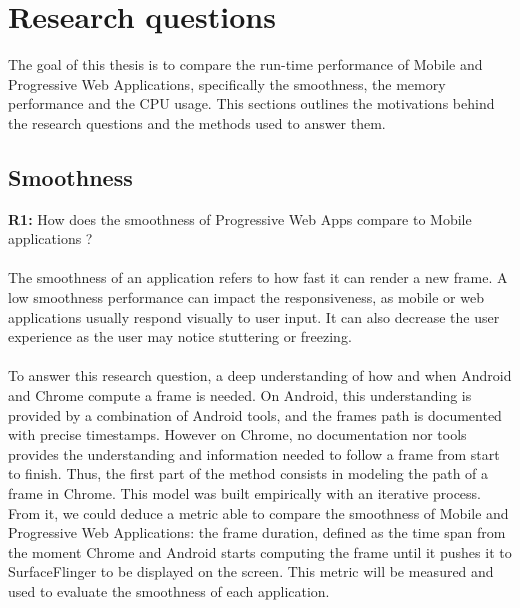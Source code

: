 \documentclass{kththesis}
\begin{document}
\section{Research questions}

The goal of this thesis is to compare the run-time performance of Mobile and Progressive Web Applications, specifically the smoothness, the memory performance and the CPU usage. This sections outlines the motivations behind the research questions and the methods used to answer them.

\subsection{Smoothness}

\textbf{R1:} How does the smoothness of Progressive Web Apps compare to Mobile applications ?
\paragraph{}
The smoothness of an application refers to how fast it can render a new frame. A low smoothness performance can impact the responsiveness, as mobile or web applications usually respond visually to user input. It can also decrease the user experience as the user may notice stuttering or freezing. 
\paragraph{}
To answer this research question, a deep understanding of how and when Android and Chrome compute a frame is needed. On Android, this understanding is provided by a combination of Android tools, and the frames path is documented with precise timestamps. However on Chrome, no documentation nor tools provides the understanding and information needed to follow a frame from start to finish. Thus, the first part of the method consists in modeling the path of a frame in Chrome. This model was built empirically with an iterative process. From it, we could deduce a metric able to compare the smoothness of Mobile and Progressive Web Applications: the frame duration, defined as the time span from the moment Chrome and Android starts computing the frame until it pushes it to SurfaceFlinger to be displayed on the screen. This metric will be measured and used to evaluate the smoothness of each application.

\end{document}
